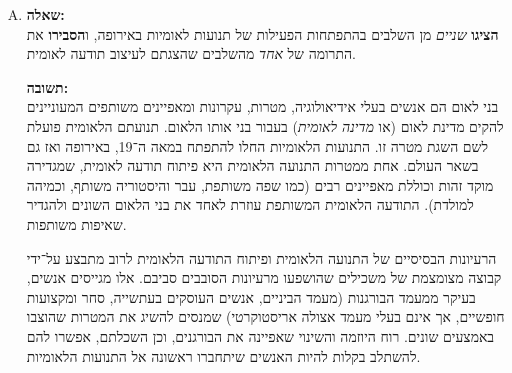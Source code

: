 \documentclass[a4paper]{article}
\newcommand\hl[1]   {#1}
\begin{document}
\begin{enumerate}[A.]
			אחרונה, נדבר על השינויים במצב הכלכלי והחברתי. התרחשה \hl{המהפכה האגררית} (התייעלות יצירת המזון, שאפשרה עבודה של יותר אנשים בערים ומפעלים שלא עוסקים באוכל באופן ישיר) והחל \hl{תהליך התיעוש} ו\hl{המעבר אל העיר}. זה גרר ריכוז רב של אנשים במקומות מטונפים וקרים, ולרוב גם התרחקות מהבית וממוקדי הזהות. התהליכים הללו גרמו לשתי תוצאות חיוביות בעבור הלאומיות – ראשית, החיפוש אחר מוקד זהות חדש הוביל אנשים רבים לפנות אל התנועות הלאומיות. הריכוז של האנשים רבים על שטח קטן עזר לתפוצה של הרעיונות הלאומיים בצורה מהירה יותר, תפוצה שהתחזקה אף יותר בזכות \hl{מהפכת הדפוס} שאפשרה לאדם הממוצע לקרוא ולעסוק בנושאים כגון אלו. ההתפשטות המהירה של רעיונות הלאומיות הובילו לחיזוק התנועות הלאומיות. 
			
			נתבונן בקטע המקור ''הד המהפכה באמריקה`` (בספר ''הלאומיות בישראל ובעמים``, הוצאת כנרת 2014, עמוד 26) העוסק בהשפעת המהפכה האמריקאית על התנועות הלאומיות. לפי קטע המקור, ''גבורתם של הרפובליקאים החדשים באמריקה רכשה לא הוקרה ברחבי אירופה וזכתה לאהדתם של כל שוחרי הצד וההומאניות, ובפרט של האנשים הצעירים`` – עקרונות הליברליזם, הנאורות, והערעור על מוסדות המלוכה שעליהם התבססה המהפכה המריקאית, נפוצו בקרב כל אירופה, ובמיוחד בדור המהפכני והחדש שגדל בה. ואף בצרפת שהייתה שנים תחת שלטון מלוכני, ''קשה לתאר את ההתלהבות, בה נתקבלו בצרפת, בתוך הממלכה העתיקה, נציגיו של עם אשר התקומם נגד מלכו`` – העם הצרפתי המשולהב ראה את ההצלחה נגד בריטניה, ורצה לממשה גם בארצו, מה שאכן התרחש כעשור לאחר מכן. 
			
			\item \textbf{שאלה: }\\
			\textbf{הציגו} \textit{שניים} מן השלבים בהתפתחות הפעילות של תנועות לאומיות באירופה, ו\textbf{הסבירו} את התרומה של \textit{אחד} מהשלבים שהצגתם לעיצוב תודעה לאומית. 
			
			\textbf{תשובה: } \\
			\hl{בני לאום} הם אנשים בעלי אידיאולוגיה, מטרות, עקרונות ומאפיינים משותפים המעוניינים להקים \hl{מדינת לאום} (או \textit{מדינה לאומית}) בעבור בני אותו הלאום. \hl{תנועתם הלאומית} פועלת לשם השגת מטרה זו. התנועות הלאומיות החלו להתפתח במאה ה־19, באירופה ואז גם בשאר העולם. אחת ממטרות התנועה הלאומית היא פיתוח \hl{תודעה לאומית}, שמגדירה מוקד זהות וכוללת מאפיינים רבים (כמו שפה משותפת, עבר והיסטוריה משותף, וכמיהה למולדת). התודעה הלאומית המשותפת עוזרת לאחד את בני הלאום השונים ולהגדיר שאיפות משותפות. 
			
			הרעיונות הבסיסיים של התנועה הלאומית ופיתוח התודעה הלאומית לרוב מתבצע על־ידי קבוצה מצומצמת של משכילים שהושפעו מרעיונות הסובבים סביבם. אלו מגייסים אנשים, בעיקר ממעמד הבורגנות (מעמד הביניים, אנשים העוסקים בעתשייה, סחר ומקצועות חופשיים, אך אינם בעלי מעמד אצולה אריסטוקרטי) שמנסים להשיג את המטרות שהוצבו באמצעים שונים. רוח היוזמה והשינוי שאפיינה את הבורגנים, וכן השכלתם, אפשרו להם להשתלב בקלות להיות האנשים שיתחברו ראשונה אל התנועות הלאומיות. 
			

\end{enumerate}
\end{document}

